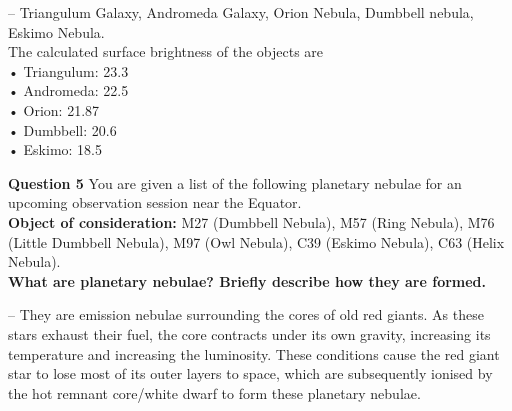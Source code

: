 \documentclass[a4paper,12pt]{extarticle}
\begin{document}
\begin{sol}
-- Triangulum Galaxy, Andromeda Galaxy, Orion Nebula, Dumbbell nebula, Eskimo
Nebula.\\
The calculated surface brightness of the objects are\\
• Triangulum: 23.3\\
• Andromeda: 22.5\\
• Orion: 21.87\\
• Dumbbell: 20.6\\
• Eskimo: 18.5	
\end{sol}


\vspace{0.5 cm}

\textsf{\textbf{Question 5}} You are given a list of the following planetary nebulae for an upcoming observation session near the Equator. \\

\textbf{Object of consideration:} M27 (Dumbbell Nebula), M57 (Ring Nebula), M76 (Little Dumbbell Nebula), M97 (Owl Nebula), C39 (Eskimo Nebula), C63 (Helix Nebula).\\

\textbf{What are planetary nebulae? Briefly describe how they are formed.}
\begin{sol}
-- They are emission nebulae surrounding the cores of old red giants. As these stars exhaust their fuel, the core contracts under its own gravity, increasing its temperature and
increasing the luminosity. These conditions cause the red giant star to lose most of its outer layers to space, which are subsequently ionised by the hot remnant core/white dwarf to form these planetary nebulae.	
\end{sol}
\end{document}
